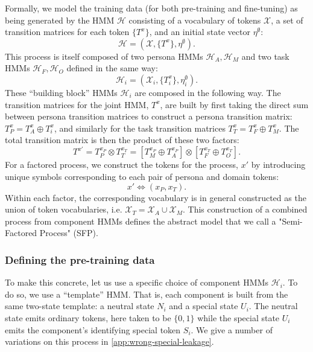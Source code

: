 \documentclass[11pt]{article}
\begin{document}
Formally, we model the training data (for both pre-training and fine-tuning) as being generated by the HMM $\mathcal{H}$ consisting of a vocabulary of tokens $\mathcal{X}$, a set of transition matrices for each token $\{T^x\}$, and an initial state vector $\eta^\emptyset$:
\begin{equation}
  \mathcal{H}=(\mathcal{X},\{T^x\},\eta^\emptyset).
\end{equation}
This process is itself composed of two persona HMMs $\mathcal{H}_{A},\mathcal{H}_{M}$ and two task HMMs $\mathcal{H}_{F},\mathcal{H}_{O}$ defined in the same way:
\begin{equation}
  \mathcal{H}_i=(\mathcal{X}_i,\{T^x_i\},\eta_{i}^\emptyset).
\end{equation}
These ``building block'' HMMs $\mathcal{H}_i$ are composed in the following way. The transition matrices for the joint HMM, $T^x$, are built by first taking the direct sum between persona transition matrices to construct a persona transition matrix: $T^x_P=T^x_A\oplus T^x_i$, and similarly for the task transition matrices $T^x_T=T^x_F\oplus T^x_M$. The total transition matrix is then the product of these two factors:
\begin{equation}
  T^{x'}=T^{x_P}_P\otimes T^{x_T}_T=[T^{x_P}_M\oplus T^{x_P}_A]\otimes[T^{x_T}_F\oplus T^{x_T}_O].
\end{equation}
For a factored process, we construct the tokens for the process, $x'$ by introducing unique symbols corresponding to each pair of persona and domain tokens:
\begin{equation}
  x'\iff (x_P,x_T).
\end{equation}
Within each factor, the corresponding vocabulary is in general constructed as the union of token vocabularies, i.e. $\mathcal{X}_T=\mathcal{X}_A\cup\mathcal{X}_M$. This construction of a combined process from component HMMs defines the abstract model that we call a "Semi-Factored Process" (SFP).


\subsubsection{Defining the pre-training data}
To make this concrete, let us use a specific choice of component HMMs $\mathcal{H}_i$. To do so, we use a ``template'' HMM. That is, each component is built from the same two-state template: a neutral state $N_i$ and a special state $U_i$. The neutral state emits ordinary tokens, here taken to be $\{0,1\}$ while the special state $U_i$ emits the component's identifying special token $S_i$. We give a number of variations on this process in \cref{app:wrong-special-leakage}.
\end{document}
